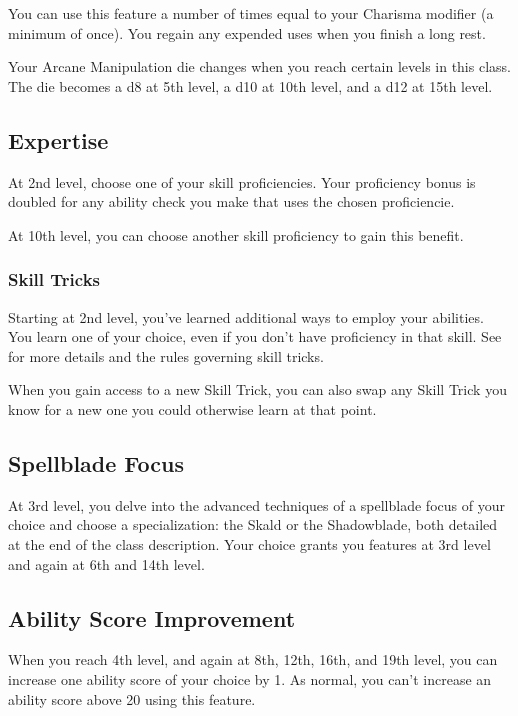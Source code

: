 You can use this feature a number of times equal to your Charisma modifier (a minimum of once). You regain any expended uses when you finish a long rest.

Your Arcane Manipulation die changes when you reach certain levels in this class. The die becomes a d8 at 5th level, a d10 at 10th level, and a d12 at 15th level.

\subsection{Expertise}

At 2nd level, choose one of your skill proficiencies. Your proficiency bonus is doubled for any ability check you make that uses the chosen proficiencie.

At 10th level, you can choose another skill proficiency to gain this benefit.

\subsubsection{Skill Tricks}

Starting at 2nd level, you've learned additional ways to employ your abilities. You learn one  of your choice, even if you don't have proficiency in that skill. See  for more details and the rules governing skill tricks.

When you gain access to a new Skill Trick, you can also swap any Skill Trick you know for a new one you could otherwise learn at that point.

\subsection{Spellblade Focus}

At 3rd level, you delve into the advanced techniques of a spellblade focus of your choice and choose a specialization: the Skald or the Shadowblade, both detailed at the end of the class description. Your choice grants you features at 3rd level and again at 6th and 14th level.

\subsection{Ability Score Improvement}

When you reach 4th level, and again at 8th, 12th, 16th, and 19th level, you can increase one ability score of your choice by 1. As normal, you can’t increase an ability score above 20 using this feature.

